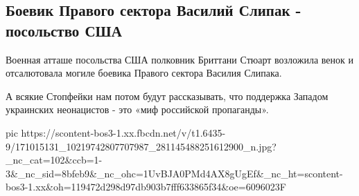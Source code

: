  
 
 
 
 

\subsection{Боевик Правого сектора Василий Слипак - посольство США}
\label{sec:10_04_2021.fb.kornilov_vladimir.1.slipak_pravsektor}

Военная атташе посольства США полковник Бриттани Стюарт возложила венок и
отсалютовала могиле боевика Правого сектора Василия Слипака.  

А всякие Стопфейки нам потом будут рассказывать, что поддержка Западом
украинских неонацистов - это «миф российской пропаганды».

\ifcmt
  pic https://scontent-bos3-1.xx.fbcdn.net/v/t1.6435-9/171015131_10219742807707987_281145488251612900_n.jpg?_nc_cat=102&ccb=1-3&_nc_sid=8bfeb9&_nc_ohc=1UvBJA0PMd4AX8gUgEf&_nc_ht=scontent-bos3-1.xx&oh=119472d298d97db903b7fff633865f34&oe=6096023F
\fi
